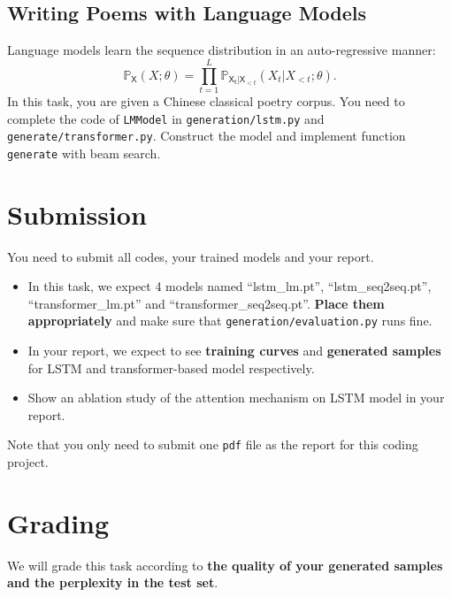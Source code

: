 \documentclass{article}
\newcommand{\rv}[1]{\mathsf{#1}}
\begin{document}
\subsection{Writing Poems with Language Models}

Language models learn the sequence distribution in an auto-regressive manner:
\begin{equation*}
    \mathbb{P}_\rv{X}(X;\theta)=\prod_{t=1}^L\mathbb{P}_{\rv{X_t}|\rv{X}_{<t}}
    (X_t|X_{<t};\theta).
\end{equation*}
In this task, you are given a Chinese classical poetry corpus. You need to
complete the code of \texttt{LMModel} in \texttt{generation/lstm.py} and \texttt{generate/transformer.py}. Construct the model and implement function \texttt{generate} with beam search.


\section{Submission}
You need to submit all codes, your trained models and your report.
\begin{itemize}
    \item 
    In this task, we expect 4 models named ``lstm\_lm.pt'', ``lstm\_seq2seq.pt'', ``transformer\_lm.pt'' and
    ``transformer\_seq2seq.pt''. \textbf{Place them appropriately} and make sure that \texttt{generation/evaluation.py} runs fine.
    \item
    In your report, we expect to see \textbf{training curves} and \textbf{generated samples} for LSTM and transformer-based model respectively.
    \item
    Show an ablation study of the attention mechanism on LSTM model in your report.
\end{itemize}
Note that you only need to submit one \texttt{pdf} file as the report for this coding project.

\section{Grading}
We will grade this task according to \textbf{the quality of your generated samples
and the perplexity in the test set}.
\end{document}
